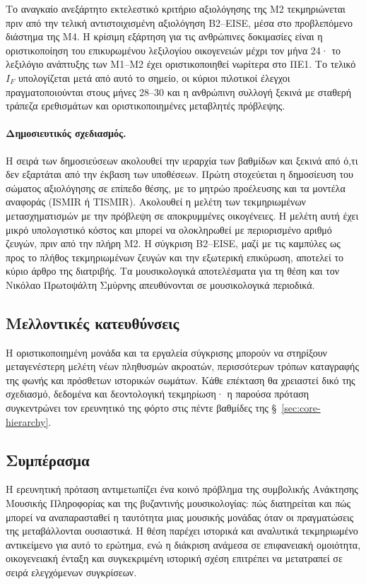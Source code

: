 \documentclass[11pt,a4paper]{article}
\begin{document}
Το αναγκαίο ανεξάρτητο εκτελεστικό κριτήριο αξιολόγησης της M2 τεκμηριώνεται πριν από την τελική αντιστοιχισμένη αξιολόγηση B2--EISE, μέσα στο προβλεπόμενο διάστημα της M4. Η κρίσιμη εξάρτηση για τις ανθρώπινες δοκιμασίες είναι η οριστικοποίηση του επικυρωμένου λεξιλογίου οικογενειών μέχρι τον μήνα 24· το λεξιλόγιο ανάπτυξης των M1--M2 έχει οριστικοποιηθεί νωρίτερα στο ΠΕ1. Το τελικό $I_F$ υπολογίζεται μετά από αυτό το σημείο, οι κύριοι πιλοτικοί έλεγχοι πραγματοποιούνται στους μήνες 28--30 και η ανθρώπινη συλλογή ξεκινά με σταθερή τράπεζα ερεθισμάτων και οριστικοποιημένες μεταβλητές πρόβλεψης.

\paragraph{Δημοσιευτικός σχεδιασμός.} Η σειρά των δημοσιεύσεων ακολουθεί την ιεραρχία των βαθμίδων και ξεκινά από ό,τι δεν εξαρτάται από την έκβαση των υποθέσεων. Πρώτη στοχεύεται η δημοσίευση του σώματος αξιολόγησης σε επίπεδο θέσης, με το μητρώο προέλευσης και τα μοντέλα αναφοράς (ISMIR ή TISMIR). Ακολουθεί η μελέτη των τεκμηριωμένων μετασχηματισμών με την πρόβλεψη σε αποκρυμμένες οικογένειες. Η μελέτη αυτή έχει μικρό υπολογιστικό κόστος και μπορεί να ολοκληρωθεί με περιορισμένο αριθμό ζευγών, πριν από την πλήρη M2. Η σύγκριση B2--EISE, μαζί με τις καμπύλες ως προς το πλήθος τεκμηριωμένων ζευγών και την εξωτερική επικύρωση, αποτελεί το κύριο άρθρο της διατριβής. Τα μουσικολογικά αποτελέσματα για τη θέση και τον Νικόλαο Πρωτοψάλτη Σμύρνης απευθύνονται σε μουσικολογικά περιοδικά.


\subsection{Μελλοντικές κατευθύνσεις}

Η οριστικοποιημένη μονάδα και τα εργαλεία σύγκρισης μπορούν να στηρίξουν μεταγενέστερη μελέτη νέων πληθυσμών ακροατών, περισσότερων τρόπων καταγραφής της φωνής και πρόσθετων ιστορικών σωμάτων. Κάθε επέκταση θα χρειαστεί δικό της σχεδιασμό, δεδομένα και δεοντολογική τεκμηρίωση· η παρούσα πρόταση συγκεντρώνει τον ερευνητικό της φόρτο στις πέντε βαθμίδες της §~\ref{sec:core-hierarchy}.

\subsection{Συμπέρασμα}

Η ερευνητική πρόταση αντιμετωπίζει ένα κοινό πρόβλημα της συμβολικής Ανάκτησης Μουσικής Πληροφορίας και της βυζαντινής μουσικολογίας: πώς διατηρείται και πώς μπορεί να αναπαρασταθεί η ταυτότητα μιας μουσικής μονάδας όταν οι πραγματώσεις της μεταβάλλονται ουσιαστικά. Η θέση παρέχει ιστορικά και αναλυτικά τεκμηριωμένο αντικείμενο για αυτό το ερώτημα, ενώ η διάκριση ανάμεσα σε επιφανειακή ομοιότητα, οικογενειακή ένταξη και συγκεκριμένη ιστορική σχέση επιτρέπει να μετατραπεί σε σειρά ελεγχόμενων συγκρίσεων.
\end{document}
